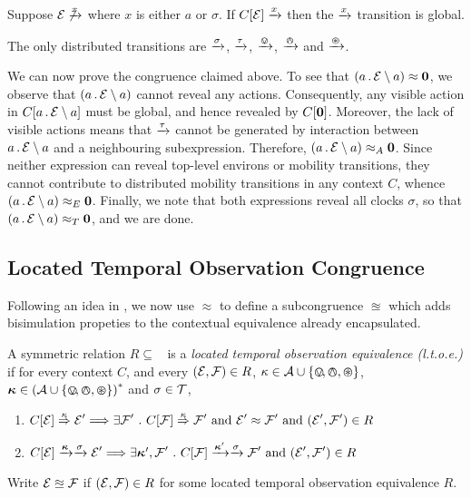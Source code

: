 \documentclass[orivec,envcountsame]{llncs}
\newcommand{\Eq}{\approx}
\newcommand{\EqA}{\mathrel{\Eq_{A}}}
\newcommand{\EqT}{\mathrel{\Eq_{T}}}
\newcommand{\EqE}{\mathrel{\Eq_{E}}}
\newcommand{\LTOC}{\approxeq}
\newcommand{\Does}[1]{\xderives{#1}}
\newcommand{\Weak}[1]{\stackrel{#1}{\Rightarrow}}
\begin{document}
\begin{proposition}
Suppose $\expr \not\Does{x}$ where $x$ is either $a$ or $\sigma$. If
$C[\expr] \Does{x}$ then the $\Does{x}$ transition is global.
\end{proposition}

\begin{proposition}
The only distributed transitions are $\Does{\sigma}$, $\Does{\tau}$,
$\Does{\tin}$, $\Does{\tout}$ and $\Does{\topen}$.
\end{proposition}

We can now prove the congruence claimed above. To see that $\left(a\pref\expr
\res{a}\right) \Eq \nil$, we observe that $\left(a\,.\,\text{$\mathcal{E}$} \setminus {a}\right)$
cannot reveal any actions. Consequently, any visible action in $C[a\,.\,\text{$\mathcal{E}$}
\setminus {a}]$ must be global, and hence revealed by $C[\textbf{0}]$. Moreover, the lack of
visible actions means that $\Does{\tau}$ cannot be generated by interaction
between $a\,.\,\text{$\mathcal{E}$} \setminus {a}$ and a neighbouring subexpression. Therefore,
$\left(a\pref\expr \res{a}\right) \EqA \nil$. Since neither expression can
reveal top-level environs or mobility transitions, they cannot contribute to
distributed mobility transitions in any context $C$, whence $\left(a\pref\expr
\res{a}\right) \EqE \nil$. Finally, we note that both expressions reveal all
clocks $\sigma$, so that $\left(a\pref\expr \res{a}\right) \EqT \nil$, and we
are done.


\subsection{Located Temporal Observation Congruence}
\label{sec:ltoc}

Following an idea in \cite{case}, we now use $\Eq$ to define a subcongruence
$\LTOC$ which adds bisimulation propeties to the contextual equivalence already
encapsulated.

\begin{definition}

A symmetric relation $R\mathrel{\subseteq}\mathop{\EqE}$ is a \emph{located
temporal observation equivalence (l.t.o.e.)} if for every context $C$, and every
  $(\text{$\mathcal{E}$},\text{$\mathcal{F}$}) \in R$, 
  $\kappa \in \text{$\mathcal{A}$} \cup \{ \varovee\!, \varowedge , \varoast \}$,
  $\vec{\kappa} \in \left(\actions \cup \{ \tntin, \tntout, \tntopen \}\right)^*$ and 
  $\sigma \in \text{$\mathcal{T}$}$,

\begin{enumerate}
\item
    $C[\expr] \Weak{\kappa} \expr' \Longrightarrow 
       \exists \exprb' ~.~ C[\exprb] \Weak{\kappa} \exprb' \mbox{ and } \expr' \Eq \exprb' \mbox{ and } (\expr', \exprb') \in R$ 
\item
    $C[\expr] \Does{\vec{\kappa}}\Does{\sigma} \expr' \Longrightarrow
       \exists \vec{\kappa}', \exprb' ~.~ 
       C[\exprb] \Does{\vec{\kappa}'}\Does{\sigma} \exprb' \mbox{ and } (\expr', \exprb') \in R$
\end{enumerate}
Write $\expr \LTOC \exprb$ if $(\text{$\mathcal{E}$},\text{$\mathcal{F}$}) \in R$ for some located temporal observation
equivalence $R$.
\end{definition}
\end{document}
